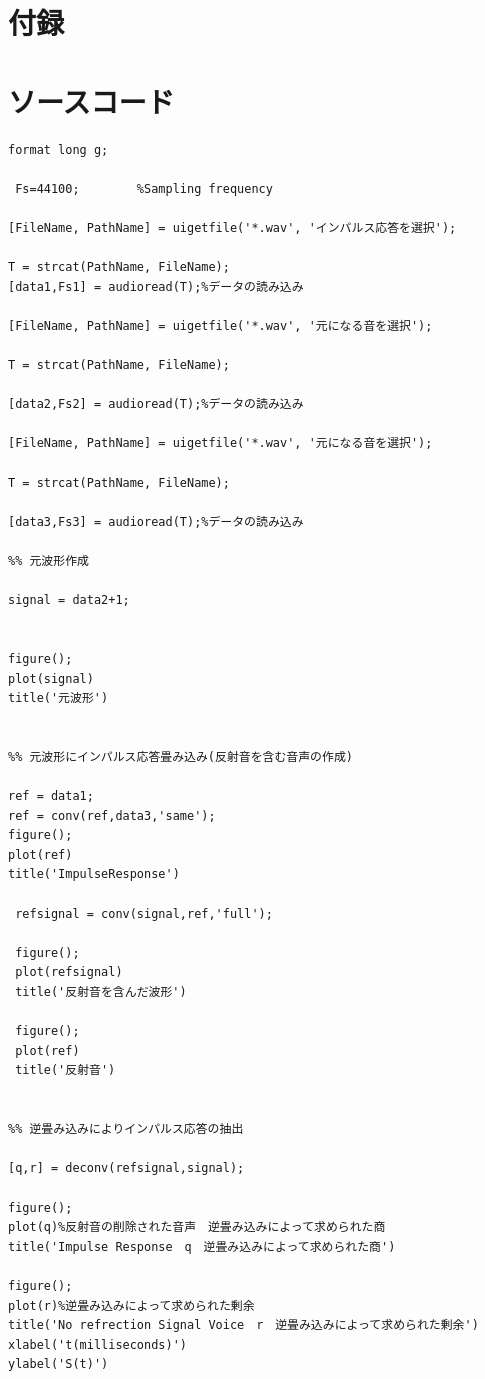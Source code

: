 \documentclass[a4j,11pt]{jsarticle}
\begin{document}
\newpage
\section*{付録}
\appendix
\section{ソースコード}


\begin{lstlisting}[caption=残響除去,label=fuga]
format long g;

 Fs=44100;        %Sampling frequency

[FileName, PathName] = uigetfile('*.wav', 'インパルス応答を選択');

T = strcat(PathName, FileName);
[data1,Fs1] = audioread(T);%データの読み込み

[FileName, PathName] = uigetfile('*.wav', '元になる音を選択');

T = strcat(PathName, FileName);

[data2,Fs2] = audioread(T);%データの読み込み

[FileName, PathName] = uigetfile('*.wav', '元になる音を選択');

T = strcat(PathName, FileName);

[data3,Fs3] = audioread(T);%データの読み込み

%% 元波形作成

signal = data2+1;


figure();
plot(signal)
title('元波形')


%% 元波形にインパルス応答畳み込み(反射音を含む音声の作成)

ref = data1;
ref = conv(ref,data3,'same');
figure();
plot(ref)
title('ImpulseResponse')

 refsignal = conv(signal,ref,'full');
 
 figure();
 plot(refsignal)
 title('反射音を含んだ波形')
 
 figure();
 plot(ref)
 title('反射音')


%% 逆畳み込みによりインパルス応答の抽出

[q,r] = deconv(refsignal,signal);

figure();
plot(q)%反射音の削除された音声　逆畳み込みによって求められた商
title('Impulse Response　q　逆畳み込みによって求められた商')

figure();
plot(r)%逆畳み込みによって求められた剰余
title('No refrection Signal Voice　r　逆畳み込みによって求められた剰余')
xlabel('t(milliseconds)')
ylabel('S(t)')



\end{lstlisting}
\end{document}
